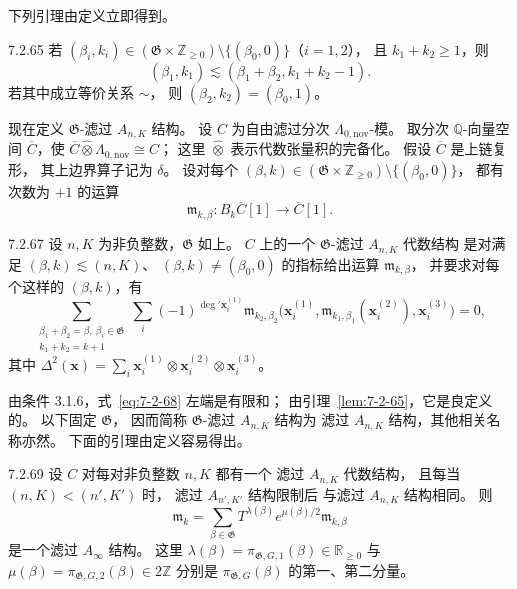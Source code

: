 下列引理由定义立即得到。
\begin{lemma}{7.2.65}\label{lem:7-2-65}
若
$(\beta_i,k_i)\in
(\mathfrak G\times\mathbb Z_{\ge0})
\setminus\{(\beta_0,0)\}$（$i=1,2$），
且 $k_1+k_2\ge1$，则
\[
(\beta_1,k_1)\lesssim
(\beta_1+\beta_2,k_1+k_2-1).
\]
若其中成立等价关系 $\sim$，
则 $(\beta_2,k_2)=(\beta_0,1)$。%
\end{lemma}

现在定义 $\mathfrak G$-滤过 $A_{n,K}$ 结构。
设 $C$ 为自由滤过分次 $\Lambda_{0,\mathrm{nov}}$-模。
取分次 $\mathbb Q$-向量空间 $\overline C$，使
$\overline C\widehat\otimes\Lambda_{0,\mathrm{nov}}\cong C$；
这里 $\widehat\otimes$ 表示代数张量积的完备化。
假设 $\overline C$ 是上链复形，
其上边界算子记为 $\delta$。
设对每个
$(\beta,k)\in
(\mathfrak G\times\mathbb Z_{\ge0})
\setminus\{(\beta_0,0)\}$，
都有次数为 $+1$ 的运算
\begin{equation}
\mathfrak m_{k,\beta}\colon
B_k\overline C[1]\longrightarrow\overline C[1].
\tag{7.2.66}\label{eq:7-2-66}
\end{equation}

\begin{definition}{7.2.67}\label{def:7-2-67}
设 $n,K$ 为非负整数，$\mathfrak G$ 如上。
$C$ 上的一个 $\mathfrak G$-滤过 $A_{n,K}$ 代数结构
%
是对满足
$(\beta,k)\lesssim(n,K)$、
$(\beta,k)\ne(\beta_0,0)$ 的指标给出运算
$\mathfrak m_{k,\beta}$，
并要求对每个这样的 $(\beta,k)$，有
\begin{equation}
\sum_{\substack{\beta_1+\beta_2=\beta,\ \beta_i\in\mathfrak G\\
                  k_1+k_2=k+1}}
\sum_i(-1)^{\deg'\mathbf x_i^{(1)}}
\mathfrak m_{k_2,\beta_2}
\bigl(\mathbf x_i^{(1)},
\mathfrak m_{k_1,\beta_1}(\mathbf x_i^{(2)}),
\mathbf x_i^{(3)}\bigr)=0,
\tag{7.2.68}\label{eq:7-2-68}
\end{equation}
其中
$\Delta^2(\mathbf x)=
\sum_i\mathbf x_i^{(1)}\otimes
\mathbf x_i^{(2)}\otimes\mathbf x_i^{(3)}$。
\end{definition}
%

由条件 3.1.6，式~\eqref{eq:7-2-68} 左端是有限和；
由引理~\ref{lem:7-2-65}，它是良定义的。
以下固定 $\mathfrak G$，
因而简称 $\mathfrak G$-滤过 $A_{n,K}$ 结构为
滤过 $A_{n,K}$ 结构，其他相关名称亦然。
下面的引理由定义容易得出。

\begin{lemma}{7.2.69}\label{lem:7-2-69}
设 $C$ 对每对非负整数 $n,K$ 都有一个
滤过 $A_{n,K}$ 代数结构，
且每当 $(n,K)<(n',K')$ 时，
滤过 $A_{n',K'}$ 结构限制后
与滤过 $A_{n,K}$ 结构相同。
则
\[
\mathfrak m_k=
\sum_{\beta\in\mathfrak G}
T^{\lambda(\beta)}e^{\mu(\beta)/2}
\mathfrak m_{k,\beta}
\]
是一个滤过 $A_\infty$ 结构。
这里
$\lambda(\beta)=\pi_{\mathfrak G,G,1}(\beta)
\in\mathbb R_{\ge0}$
与
$\mu(\beta)=\pi_{\mathfrak G,G,2}(\beta)
\in2\mathbb Z$
分别是 $\pi_{\mathfrak G,G}(\beta)$ 的第一、第二分量。
\end{lemma}

